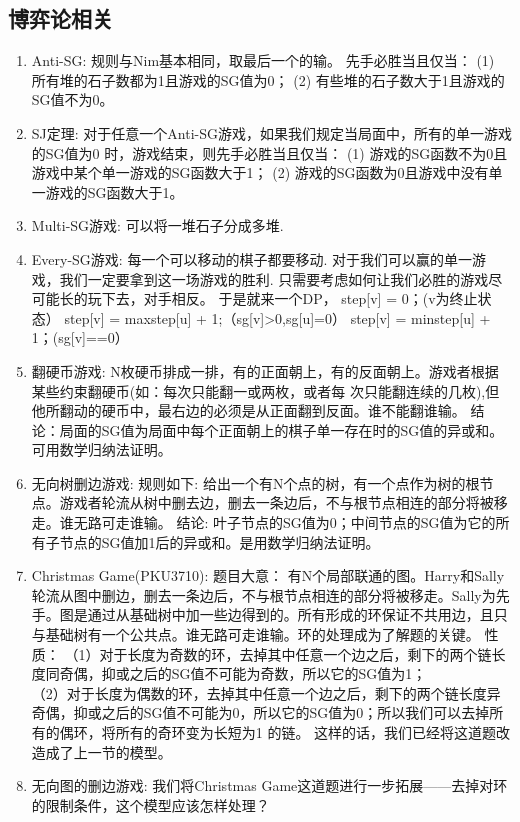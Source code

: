 \documentclass[landscape,a4paper]{article}
\begin{document}
\begin{spacing}{0.3}
\begin{multicols}{2}
	\subsection{博弈论相关}
\begin{enumerate}
	\item Anti-SG:
		规则与Nim基本相同，取最后一个的输。
		先手必胜当且仅当：
		(1) 所有堆的石子数都为1且游戏的SG值为0；
		(2) 有些堆的石子数大于1且游戏的SG值不为0。
	\item SJ定理:
		对于任意一个Anti-SG游戏，如果我们规定当局面中，所有的单一游戏的SG值为0 时，游戏结束，则先手必胜当且仅当：
		(1) 游戏的SG函数不为0且游戏中某个单一游戏的SG函数大于1；
		(2) 游戏的SG函数为0且游戏中没有单一游戏的SG函数大于1。
	\item Multi-SG游戏:
		可以将一堆石子分成多堆.
	\item Every-SG游戏:
		每一个可以移动的棋子都要移动.
		对于我们可以赢的单一游戏，我们一定要拿到这一场游戏的胜利.
		只需要考虑如何让我们必胜的游戏尽可能长的玩下去，对手相反。
		于是就来一个DP，
		step[v] = 0；(v为终止状态）
		step[v] = max{step[u]} + 1;（sg[v]>0,sg[u]=0）
		step[v] = min{step[u]} + 1；(sg[v]==0）
	\item 翻硬币游戏:
		N枚硬币排成一排，有的正面朝上，有的反面朝上。游戏者根据某些约束翻硬币(如：每次只能翻一或两枚，或者每 次只能翻连续的几枚),但他所翻动的硬币中，最右边的必须是从正面翻到反面。谁不能翻谁输。
		结论：局面的SG值为局面中每个正面朝上的棋子单一存在时的SG值的异或和。可用数学归纳法证明。
	\item 无向树删边游戏:
		规则如下:
		给出一个有N个点的树，有一个点作为树的根节点。游戏者轮流从树中删去边，删去一条边后，不与根节点相连的部分将被移走。谁无路可走谁输。
		结论:
		叶子节点的SG值为0；中间节点的SG值为它的所有子节点的SG值加1后的异或和。是用数学归纳法证明。
	\item Christmas Game(PKU3710):
		题目大意：
		有N个局部联通的图。Harry和Sally轮流从图中删边，删去一条边后，不与根节点相连的部分将被移走。Sally为先手。图是通过从基础树中加一些边得到的。所有形成的环保证不共用边，且只与基础树有一个公共点。谁无路可走谁输。环的处理成为了解题的关键。
		性质：
		（1）对于长度为奇数的环，去掉其中任意一个边之后，剩下的两个链长度同奇偶，抑或之后的SG值不可能为奇数，所以它的SG值为1；\\
		（2）对于长度为偶数的环，去掉其中任意一个边之后，剩下的两个链长度异奇偶，抑或之后的SG值不可能为0，所以它的SG值为0；所以我们可以去掉所有的偶环，将所有的奇环变为长短为1 的链。
		这样的话，我们已经将这道题改造成了上一节的模型。
	\item 无向图的删边游戏:
		我们将Christmas Game这道题进行一步拓展——去掉对环的限制条件，这个模型应该怎样处理？

\end{enumerate}
\end{multicols}
\end{spacing}
\end{document}
